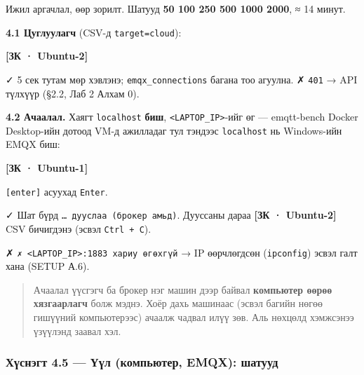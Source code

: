 Ижил аргачлал, өөр зорилт. Шатууд \textbf{50 100 250 500 1000 2000}, ≈ 14 минут.

\textbf{4.1 Цуглуулагч} (CSV-д \texttt{target=cloud}):

\textbf{{[}ЗК · Ubuntu-2{]}}

\begin{Shaded}
\begin{Highlighting}[]
\end{Highlighting}
\end{Shaded}

✓ 5 сек тутам мөр хэвлэнэ; \texttt{emqx\_\allowbreak{}connections} багана тоо агуулна. ✗ \texttt{401} → API түлхүүр (§2.2, Лаб 2 Алхам 0).

\textbf{4.2 Ачаалал.} Хаягт \texttt{localhost} \textbf{биш}, \texttt{\textless{}LAPTOP\_\allowbreak{}IP\textgreater{}}-ийг өг --- emqtt-bench Docker Desktop-ийн дотоод VM-д ажилладаг тул тэндээс \texttt{localhost} нь Windows-ийн EMQX биш:

\textbf{{[}ЗК · Ubuntu-1{]}}

\begin{Shaded}
\begin{Highlighting}[]
\OperatorTok{\textless{}}\OperatorTok{\textgreater{}}
\end{Highlighting}
\end{Shaded}

\texttt{{[}enter{]}} асуухад \texttt{Enter}.

✓ Шат бүрд \texttt{\ldots{}\ дууслаа\ (брокер\ амьд)}. Дууссаны дараа \textbf{{[}ЗК · Ubuntu-2{]}} CSV бичигдэнэ (эсвэл \texttt{Ctrl\ +\ C}).

✗ \texttt{✗\ \textless{}LAPTOP\_\allowbreak{}IP\textgreater{}:\allowbreak{}1883\ хариу\ өгөхгүй} → IP өөрчлөгдсөн (\texttt{ipconfig}) эсвэл галт хана (SETUP А.6).

\begin{quote}
Ачаалал үүсгэгч ба брокер нэг машин дээр байвал \textbf{компьютер өөрөө хязгаарлагч} болж мэднэ. Хоёр дахь машинаас (эсвэл багийн нөгөө гишүүний компьютерээс) ачаалж чадвал илүү зөв. Аль нөхцөлд хэмжсэнээ үзүүлэнд заавал хэл.
\end{quote}

\hypertarget{ux445ux4afux441ux43dux44dux433ux442-4.5-ux4afux4afux43b-ux43aux43eux43cux43fux44cux44eux442ux435ux440-emqx-ux448ux430ux442ux443ux443ux434}{%
\subsubsection{Хүснэгт 4.5 --- Үүл (компьютер, EMQX): шатууд}\label{ux445ux4afux441ux43dux44dux433ux442-4.5-ux4afux4afux43b-ux43aux43eux43cux43fux44cux44eux442ux435ux440-emqx-ux448ux430ux442ux443ux443ux434}}

